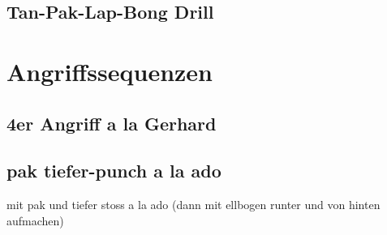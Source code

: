 \subsection{Tan-Pak-Lap-Bong Drill}


\section{Angriffssequenzen}

\subsection{4er Angriff a la Gerhard}

\subsection{pak tiefer-punch a la ado}
mit pak und tiefer stoss a la ado (dann mit ellbogen runter und von hinten aufmachen)

